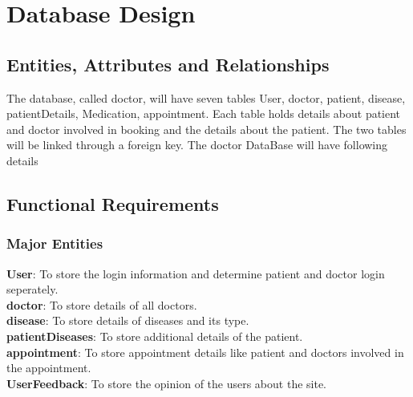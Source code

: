 \chapter{Database Design}

\section{Entities, Attributes and Relationships}
The database, called doctor, will have seven tables User, doctor, patient, disease, patientDetails, Medication, appointment. Each table holds details about patient and doctor involved in booking and the details about the patient. The two
tables will be linked through a foreign key. The doctor DataBase will have following details\\

\thispagestyle{fancy}
\section{Functional Requirements}
\subsection{Major Entities}
\textbf{User}: To store the login information and determine patient and doctor login seperately.\\
\textbf{doctor}: To store details of all doctors.\\
\textbf{disease}: To store details of diseases and its type.\\
\textbf{patientDiseases}: To store additional details of the patient.\\
\textbf{appointment}: To store appointment details like patient and doctors involved in the appointment.\\
\textbf{UserFeedback}: To store the opinion of the users about the site.\\
\thispagestyle{fancy}

